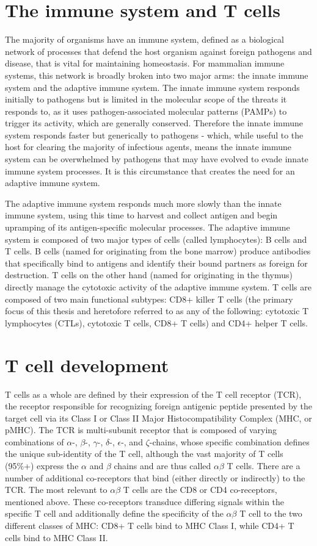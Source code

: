 \section{The immune system and T cells}
The majority of organisms have an immune system, defined as a biological network of processes that defend the host organism against foreign pathogens and disease, that is vital for maintaining homeostasis. For mammalian immune systems, this network is broadly broken into two major arms: the innate immune system and the adaptive immune system. The innate immune system responds initially to pathogens but is limited in the molecular scope of the threats it responds to, as it uses pathogen-associated molecular patterns (PAMPs) to trigger its activity, which are generally conserved. Therefore the innate immune system responds faster but generically to pathogens - which, while useful to the host for clearing the majority of infectious agents, means the innate immune system can be overwhelmed by pathogens that may have evolved to evade innate immune system processes. It is this circumstance that creates the need for an adaptive immune system.

The adaptive immune system responds much more slowly than the innate immune system, using this time to harvest and collect antigen and begin upramping of its antigen-specific molecular processes. The adaptive immune system is composed of two major types of cells (called lymphocytes): B cells and T cells. B cells (named for originating from the bone marrow) produce antibodies that specifically bind to antigens and identify their bound partners as foreign for destruction. T cells on the other hand (named for originating in the thymus) directly manage the cytotoxic activity of the adaptive immune system. T cells are composed of two main functional subtypes: CD8+ killer T cells (the primary focus of this thesis and heretofore referred to as any of the following: cytotoxic T lymphocytes (CTLs), cytotoxic T cells, CD8+ T cells) and CD4+ helper T cells. 

\section{T cell development}
T cells as a whole are defined by their expression of the T cell receptor (TCR), the receptor responsible for recognizing foreign antigenic peptide presented by the target cell via its Class I or Class II Major Histocompatibility Complex (MHC, or pMHC). The TCR is multi-subunit receptor that is composed of varying combinations of $\alpha$-, $\beta$-, $\gamma$-, $\delta$-, $\epsilon$-, and $\zeta$-chains, whose specific combination defines the unique sub-identity of the T cell, although the vast majority of T cells (95\%+) express the $\alpha$ and $\beta$ chains and are thus called $\alpha \beta$ T cells. There are a number of additional co-receptors that bind (either directly or indirectly) to the TCR. The most relevant to $\alpha \beta$ T cells are the CD8 or CD4 co-receptors, mentioned above. These co-receptors transduce differing signals within the specific T cell and additionally define the specificity of the $\alpha \beta$ T cell to the two different classes of MHC: CD8+ T cells bind to MHC Class I, while CD4+ T cells bind to MHC Class II. 

